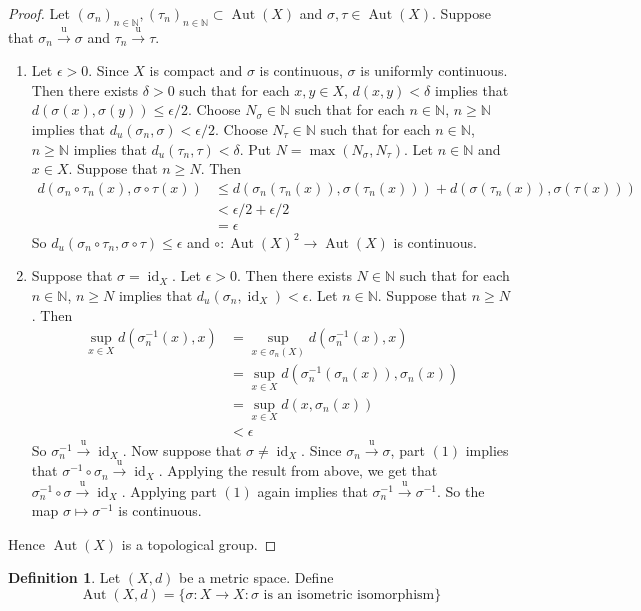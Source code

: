 \documentclass[12pt]{amsart}
\theoremstyle{definition}
\newtheorem{defn}[definition]{Definition}
\newcommand{\del}{\delta}
\newcommand{\ep}{\epsilon}
\newcommand{\sig}{\sigma}
\newcommand{\N}{\mathbb{N}}
\newcommand{\convt}[1]{\xrightarrow{\text{#1}}}
\DeclareMathOperator{\id}{id}
\DeclareMathOperator{\Aut}{Aut}
\begin{document}
	\begin{proof}
	Let $(\sig_n)_{n \in \N}, (\tau_n)_{n \in \N} \subset \Aut(X)$ and $\sig,\tau \in \Aut(X)$. Suppose that $\sig_n \convt{u} \sig$ and $\tau_n \convt{u} \tau$.
	\begin{enumerate}
	\item Let $\ep >0$. Since $X$ is compact and $\sig$ is continuous, $\sig$ is uniformly continuous. Then there exists $\del >0$ such that for each $x, y \in X$, $d(x,y) < \del$ implies that $d(\sig(x), \sig(y)) \leq \ep/2$.  Choose $N_\sig \in \N$ such that for each $n \in \N$, $ n \geq \N$ implies that $d_u(\sig_n, \sig) < \ep/2$. Choose $N_\tau \in \N$ such that for each $n \in \N$, $ n \geq \N$ implies that $d_u(\tau_n, \tau) < \del$. Put $N = \max(N_\sig, N_\tau)$. Let $n \in \N$ and $x \in X$. Suppose that $n \geq N$. Then 
	\begin{align*}
		d(\sig_n \circ \tau_n (x) ,\sig \circ \tau (x) ) 
		&\leq  d(\sig_n(\tau_n(x)),  \sig(\tau_n(x))) + d( \sig(\tau_n (x)), \sig( \tau (x))) \\
		& < \ep / 2 +\ep / 2 \\
		&= \ep 
	\end{align*}
	So $d_u(\sig_n \circ \tau_n, \sig\circ \tau) \leq \ep$ and $\circ: \Aut(X)^2 \rightarrow \Aut(X)$ is continuous. 
	\item Suppose that $\sig = \id_X$. Let $\ep >0$. Then there exists $N \in \N$ such that for each $n \in \N$, $n \geq N$ implies that $d_u(\sig_n, \id_X) < \ep$. Let $n \in \N$. Suppose that $n \geq N$. Then 
	\begin{align*}
	\sup_{x \in X} d(\sig^{-1}_n(x), x) 
	&= \sup_{x \in \sig_n(X)}d(\sig^{-1}_n(x), x) \\
	&= \sup_{x \in X}d(\sig^{-1}_n(\sig_n(x)), \sig_n(x)) \\
	&= \sup_{x \in X}d(x, \sig_n(x)) \\
	&< \ep
	\end{align*}
	So $\sig^{-1}_n \convt{u} \id_X$. Now suppose that $\sig \neq \id_X$. Since $\sig_n \convt{u} \sig$, part $(1)$ implies that $\sig^{-1} \circ \sig_n \convt{u} \id_X$. Applying the result from above, we get that $\sig_n^{-1} \circ \sig \convt{u} \id_X$. Applying part $(1)$ again implies that $\sig_n^{-1}  \convt{u}  \sig^{-1}$. So the map $\sig \mapsto \sig^{-1}$ is continuous. 
	\end{enumerate}
	Hence $\Aut(X)$ is a topological group. 
	\end{proof}
	
	\begin{defn}
	Let $(X, d)$ be a metric space. Define 
	$$\Aut(X, d) = \{\sig:X\rightarrow X: \sig \text{ is an isometric isomorphism} \}$$  
	\end{defn}
	
\end{document}
